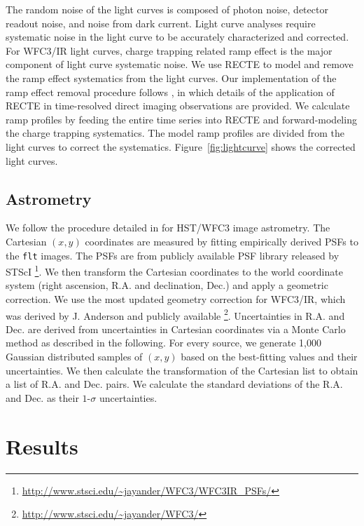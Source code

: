 \documentclass[twocolumn]{aastex62}
\begin{document}
The random noise of the light curves is composed of  photon noise, detector readout noise, and noise from dark current. Light curve analyses require systematic noise in the light curve to be accurately characterized and corrected. For WFC3/IR light curves, charge trapping related ramp effect is the major component of light curve systematic noise. We use RECTE \citep{Zhou2017} to model and remove the ramp effect systematics from the light curves. Our implementation of the ramp effect removal procedure follows \citet{Zhou2019}, in which details of the application of RECTE in time-resolved direct imaging observations are provided. We calculate ramp profiles by feeding the entire time series into RECTE and forward-modeling the charge trapping systematics. The model ramp profiles are divided from the light curves to correct the systematics. Figure~\ref{fig:lightcurve} shows the corrected light curves.

\subsection{Astrometry}
We follow the procedure detailed in \citet{Bedin2018} for HST/WFC3 image astrometry.
The Cartesian $(x, y)$ coordinates are measured by fitting empirically derived PSFs to the \texttt{flt} images. The PSFs are from publicly available PSF library released by STScI \footnote{\url{http://www.stsci.edu/~jayander/WFC3/WFC3IR\_PSFs/}}. We then transform the Cartesian coordinates to the world coordinate system (right ascension, {R.A.} and declination, {Dec.}) and apply a geometric correction. We use the most updated geometry correction for WFC3/IR, which was derived by J. Anderson and publicly available \footnote{\url{http://www.stsci.edu/~jayander/WFC3/}}.  Uncertainties in {R.A.} and {Dec.} are derived from uncertainties in Cartesian coordinates via a Monte Carlo method as described in the following. For every source, we generate 1,000 Gaussian distributed samples of $(x, y)$  based on the best-fitting values and their uncertainties. We then calculate the transformation of the Cartesian list  to obtain a list of {R.A.} and {Dec.} pairs. We calculate the standard deviations of the {R.A.} and {Dec.} as their $1$-$\sigma$ uncertainties.

\section{Results}
\end{document}
